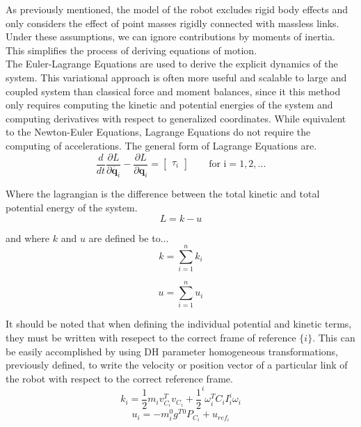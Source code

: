 \documentclass[journal]{IEEEtran}
\begin{document}
As previously mentioned, the model of the robot excludes rigid body effects and only considers the effect of point masses rigidly connected with massless links. Under these assumptions, we can ignore contributions by moments of inertia. This simplifies the process of deriving equations of motion. \\

The Euler-Lagrange Equations are used to derive the explicit dynamics of the system. This variational approach is often more useful and scalable to large and coupled system than classical force and moment balances, since it this method only requires computing the kinetic and potential energies of the system and computing derivatives with respect to generalized coordinates. While equivalent to the Newton-Euler Equations, Lagrange Equations do not require the computing of accelerations. The general form of Lagrange Equations are.
\begin{equation}
\frac{d}{d t} \frac{\partial L}{\partial \dot{\boldsymbol{q}_{i}}}-\frac{\partial L}{\partial \boldsymbol{q}_{i}}=\left[\begin{array}{l}
\tau_{i}
\end{array}\right]
 \quad \quad \text{for i} = 1,2,...
\end{equation}

\noindent Where the lagrangian is the difference between the total kinetic and total potential energy of the system.
\begin{equation}
  L = k - u
\end{equation}

\noindent and where $k$ and $u$ are defined be to...
\begin{equation}
k=\sum_{i=1}^{n} k_{i}
\end{equation}

\begin{equation}
u=\sum_{i=1}^{n} u_{i}
\end{equation}

It should be noted that when defining the individual potential and kinetic terms, they must be written with resepect to the correct frame of reference $\{ i \}$. This can be easily accomplished by using DH parameter homogeneous transformations, previously defined, to write the velocity or position vector of a particular link of the robot with respect to the correct reference frame.
\begin{equation}
k_{i}=\frac{1}{2} m_{i} v_{C_{i}}^{T} v_{C_{i}}+\frac{1}{2}^{i} \omega_{i}^{T} C_{i} I_{i}^{i} \omega_{i}
\end{equation}
\begin{equation}
u_{i}=-m_{i}^{0} g^{T}{ }^{0} P_{C_{i}}+u_{r e f_{i}}
\end{equation}
\end{document}
